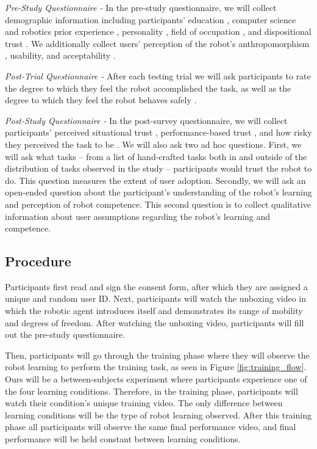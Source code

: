 \documentclass[letterpaper]{article} %
\begin{document}
\textit{Pre-Study Questionnaire -} In the pre-study questionnaire, we will collect demographic information including participants' education \cite{raub_correlates_nodate}, computer science and robotics prior experience \cite{raub_correlates_nodate}, personality \cite{donnellan_mini-ipip_2006}, field of occupation \cite{noauthor_college_nodate}, and dispositional trust \cite{merritt_i_2013}. We additionally collect users' perception of the robot's anthropomorphism \cite{bartneck_measurement_2009}, usability, and acceptability \cite{belanche_integrating_2012}.

\textit{Post-Trial Questionnaire -}
After each testing trial we will ask participants to rate the degree to which they feel the robot accomplished the task, as well as the degree to which they feel the robot behaves safely \cite{bartneck_measurement_2009}.

\textit{Post-Study Questionnaire -}
In the post-survey questionnaire, we will collect participants' perceived situational trust \cite{jian_foundations_2000}, performance-based trust \cite{malle_multidimensional_2021}, and how risky they perceived the task to be \cite{fischhoff_how_1978}. We will also ask two ad hoc questions. First, we will ask what tasks -- from a list of hand-crafted tasks both in and outside of the distribution of tasks observed in the study -- participants would trust the robot to do. This question measures the extent of user adoption. Secondly, we will ask an open-ended question about the participant’s understanding of the robot’s learning and perception of robot competence. This second question is to collect qualitative information about user assumptions regarding the robot's learning and competence.

\subsection{Procedure}
\label{sec:procedure}
Participants first read and sign the consent form, after which they are assigned a unique and random user ID. Next, participants will watch the unboxing video in which the robotic agent introduces itself and demonstrates its range of mobility and degrees of freedom. After watching the unboxing video, participants will fill out the pre-study questionnaire. 

Then, participants will go through the training phase where they will observe the robot learning to perform the training task, as seen in Figure \ref{fig:training_flow}. Ours will be a between-subjects experiment where participants experience one of the four learning conditions. Therefore, in the training phase, participants will watch their condition's unique training video. The only difference between learning conditions will be the type of robot learning observed. After this training phase all participants will observe the same final performance video, and final performance will be held constant between learning conditions. 
\end{document}
